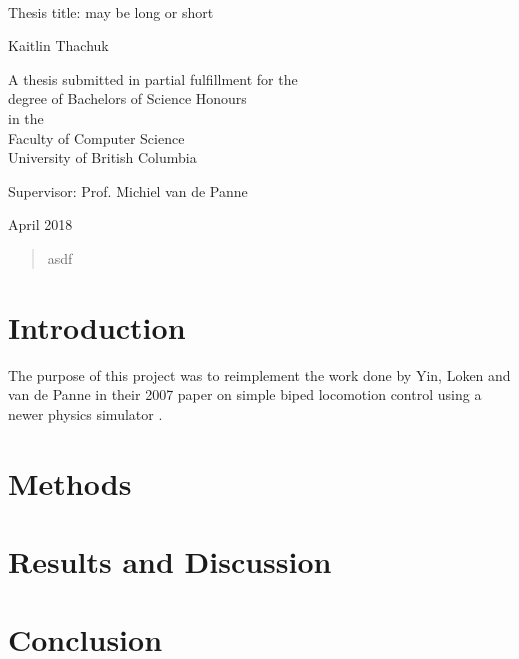 \documentclass[12pt,a4paper]{article}
\begin{document}
\begin{titlepage}

\centering
\Large

~\vspace{\fill}

{\huge 
Thesis title: may be long or short
}

\vspace{1.5cm}

{\LARGE
Kaitlin Thachuk
}

\vspace{3.5cm}

A thesis submitted in partial fulfillment for the\\
degree of Bachelors of Science Honours\\[1em]
in the\\[1em]
Faculty of Computer Science\\[1em]
University of British Columbia

\vspace{3.5cm}

Supervisor: Prof. Michiel van de Panne

\vspace{\fill}

April 2018
\end{titlepage}
\begin{titlepage}


\begin{abstract}
asdf
\end{abstract}
\end{titlepage}
\newpage
{}
\tableofcontents
\listoffigures
\listoftables

\newpage
\section{Introduction}
The purpose of this project was to reimplement the work done by Yin, Loken and van de Panne in their 2007 paper on simple biped locomotion control using a newer physics simulator \cite{Yin07}.  \cite{Panne94virtualwind-up} 
\cite{Geijtenbeek} \cite{Raibert}
\section{Methods}
\section{Results and Discussion}
\section{Conclusion}
\end{document}
